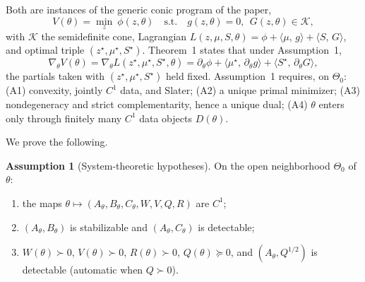 \documentclass[11pt]{article}
\theoremstyle{definition}
\newtheorem{assumption}{Assumption}
\newcommand{\Th}{\theta}
\newcommand{\Nbhd}{\Theta_{0}}
\newcommand{\half}{{1/2}}
\newcommand{\inner}[2]{\langle #1,\, #2\rangle}
\begin{document}
Both are instances of the generic conic program of the paper,
\begin{equation}\label{eq:generic}
V(\Th)=\min_{z}\ \phi(z,\Th)\quad\text{s.t.}\quad
g(z,\Th)=0,\ \ G(z,\Th)\in\mathcal K,
\end{equation}
with $\mathcal K$ the semidefinite cone, Lagrangian
$L(z,\mu,S,\Th)=\phi+\inner{\mu}{g}+\inner{S}{G}$, and optimal triple
$(z^\star,\mu^\star,S^\star)$. Theorem~1 states that under Assumption~1,
\begin{equation}\label{eq:envelope}
\nabla_\Th V(\Th)=\nabla_\Th L(z^\star,\mu^\star,S^\star,\Th)
=\partial_\Th\phi+\inner{\mu^\star}{\partial_\Th g}
+\inner{S^\star}{\partial_\Th G},
\end{equation}
the partials taken with $(z^\star,\mu^\star,S^\star)$ held fixed. Assumption~1
requires, on $\Nbhd$: (A1) convexity, jointly $C^1$ data, and Slater; (A2) a
unique primal minimizer; (A3) nondegeneracy and strict complementarity, hence a
unique dual; (A4) $\Th$ enters only through finitely many $C^1$ data objects
$D(\Th)$.

We prove the following.

\begin{assumption}[System-theoretic hypotheses]\label{as:sys}
On the open neighborhood $\Nbhd$ of $\Th$:
\begin{enumerate}
\item[\textup{(S1)}] the maps $\Th\mapsto(A_\Th,B_\Th,C_\Th,W,V,Q,R)$ are $C^1$;
\item[\textup{(S2)}] $(A_\Th,B_\Th)$ is stabilizable and $(A_\Th,C_\Th)$ is
detectable;
\item[\textup{(S3)}] $W(\Th)\succ0$, $V(\Th)\succ0$, $R(\Th)\succ0$,
$Q(\Th)\succeq0$, and $(A_\Th,Q^{\half})$ is detectable
\textup{(}automatic when $Q\succ0$\textup{)}.
\end{enumerate}
\end{assumption}
\end{document}
